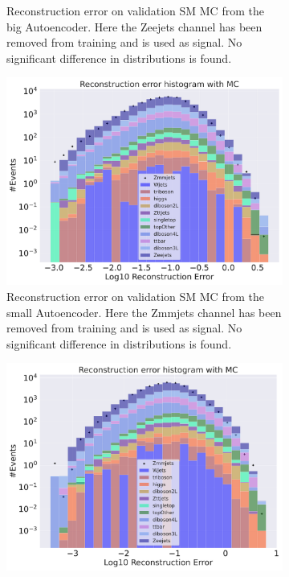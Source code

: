 \begin{figure}[H]
\begin{subfigure}{.45\textwidth}
        \caption{Reconstruction error on validation SM MC from the big Autoencoder. Here the Zeejets channel has been removed from training and 
        is used as signal. No significant difference in distributions is found. }
        \label{fig:vae_big_Zeejets}
    \end{subfigure}
    \hfill 
    \begin{subfigure}{.45\textwidth}
        \includegraphics[width=\textwidth]{Figures/VAE_testing/small/b_data_recon_big_rm3_feats_sig_Zmmjets.pdf}
        \caption{Reconstruction error on validation SM MC from the small Autoencoder. Here the Zmmjets channel has been removed from training and 
        is used as signal. No significant difference in distributions is found. }
        \label{fig:vae_small_Zmmjets}
    \end{subfigure}
    \hfill
    \begin{subfigure}{.45\textwidth}
        \includegraphics[width=\textwidth]{Figures/VAE_testing/big/b_data_recon_big_rm3_feats_sig_Zmmjets.pdf}

\end{subfigure}
\end{figure}
